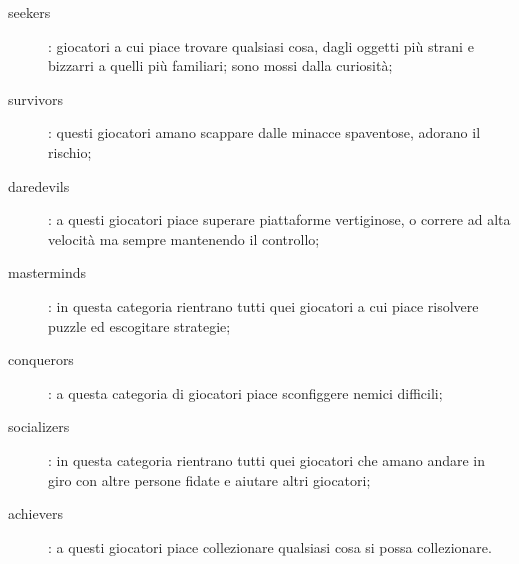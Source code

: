 \begin{description}
    \item[seekers]: giocatori a cui piace trovare qualsiasi cosa, dagli oggetti più strani e bizzarri a quelli più familiari; sono mossi dalla curiosità;
    \item[survivors]: questi giocatori amano scappare dalle minacce spaventose, adorano il rischio;
    \item[daredevils]: a questi giocatori piace superare piattaforme vertiginose, o correre ad alta velocità ma sempre mantenendo il controllo;
    \item[masterminds]: in questa categoria rientrano tutti quei giocatori a cui piace risolvere puzzle ed escogitare strategie;
    \item[conquerors]: a questa categoria di giocatori piace sconfiggere nemici difficili;
    \item[socializers]: in questa categoria rientrano tutti quei giocatori che amano andare in giro con altre persone fidate e aiutare altri giocatori;
    \item[achievers]: a questi giocatori piace collezionare qualsiasi cosa si possa collezionare.
\end{description}

